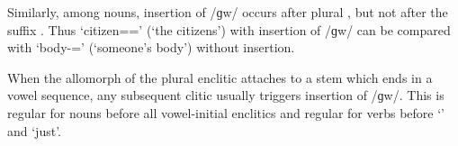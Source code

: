 Similarly, among nouns, insertion of /ɡw/ occurs after plural ,
but not after the  suffix .
Thus  `citizen={\ein}={\ee}' (`the citizens')
with insertion of /ɡw/ can be compared
with  `body-{\N}={\ee}' (`someone's body') without insertion.

When the  allomorph of the plural enclitic
attaches to a stem which ends in a vowel sequence,
any subsequent clitic usually triggers insertion of /ɡw/.
This is regular for nouns before all vowel-initial
enclitics and regular for verbs before  `{\een}'
and  `just'.
